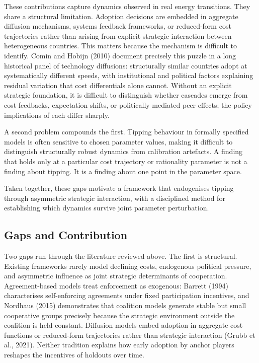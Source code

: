 \documentclass[10pt,a4paper]{article}
\begin{document}
These contributions capture dynamics observed in real energy transitions. They share a structural
limitation. Adoption decisions are embedded in aggregate diffusion mechanisms, systems feedback
frameworks, or reduced-form cost trajectories rather than arising from explicit strategic interaction
between heterogeneous countries. This matters because the mechanism is difficult to identify. Comin and
Hobijn (2010) document precisely this puzzle in a long historical panel of technology diffusions:
structurally similar countries adopt at systematically different speeds, with institutional and political
factors explaining residual variation that cost differentials alone cannot. Without an explicit strategic
foundation, it is difficult to distinguish whether cascades emerge from cost feedbacks, expectation shifts,
or politically mediated peer effects; the policy implications of each differ sharply.

A second problem compounds the first. Tipping behaviour in formally specified models is often sensitive
to chosen parameter values, making it difficult to distinguish structurally robust dynamics from
calibration artefacts. A finding that holds only at a particular cost trajectory or rationality parameter is not
a finding about tipping. It is a finding about one point in the parameter space.

Taken together, these gaps motivate a framework that endogenises tipping through asymmetric strategic interaction, with a disciplined method for establishing which dynamics survive joint parameter perturbation.

\needspace{12em}
\subsection*{Gaps and Contribution}

Two gaps run through the literature reviewed above. The first is structural. Existing frameworks rarely
model declining costs, endogenous political pressure, and asymmetric influence as joint strategic
determinants of cooperation. Agreement-based models treat enforcement as exogenous: Barrett (1994)
characterises self-enforcing agreements under fixed participation incentives, and Nordhaus (2015)
demonstrates that coalition models generate stable but small cooperative groups precisely because the
strategic environment outside the coalition is held constant. Diffusion models embed adoption in
aggregate cost functions or reduced-form trajectories rather than strategic interaction (Grubb et al., 2021).
Neither tradition explains how early adoption by anchor players reshapes the incentives of holdouts over time.
\end{document}
